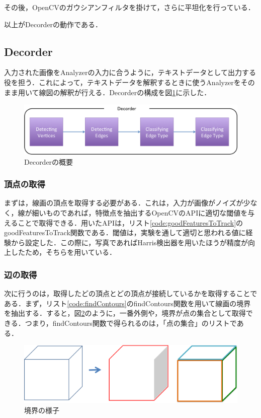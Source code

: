 \documentclass{jarticle}
\begin{document}
その後，OpenCVのガウシアンフィルタを掛けて，さらに平坦化を行っている．

以上がDecorderの動作である．





\subsection{Decorder}
入力された画像をAnalyzerの入力に合うように，テキストデータとして出力する役を担う．これによって，テキストデータを解釈するときに使うAnalyzerをそのまま用いて線図の解釈が行える．Decorderの構成を図\ref{fig:decorder}に示した．
\begin{figure}[H]
\begin{center}
\includegraphics[width=130mm]{image/decorder.png}
\caption{Decorderの概要}
\label{fig:decorder}
\end{center}
\end{figure}


\subsubsection{頂点の取得}
まずは，線画の頂点を取得する必要がある．これは，入力が画像がノイズが少なく，線が細いものであれば，特徴点を抽出するOpenCVのAPIに適切な閾値を与えることで取得できる．用いたAPIは，リスト\ref{code:goodFeaturesToTrack}のgoodFeaturesToTrack関数である．閾値は，実験を通して適切と思われる値に経験から設定した．この際に，写真であればHarris検出器を用いたほうが精度が向上したため，そちらを用いている．
\lstset{style=customjava}





\subsubsection{辺の取得}
次に行うのは，取得したどの頂点とどの頂点が接続しているかを取得することである．まず，リスト\ref{code:findContours}のfindContours関数を用いて線画の境界を抽出する．すると，図\ref{fig:contours}のように，一番外側や，境界が点の集合として取得できる．つまり，findContours関数で得られるのは，「点の集合」のリストである．
\begin{figure}[H]
\begin{center}
\includegraphics[width=130mm]{image/contours.png}
\caption{境界の様子}
\label{fig:contours}
\end{center}
\end{figure}
\end{document}
